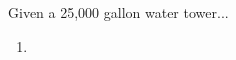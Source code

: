 \documentclass{ximera}
\author{Elizabeth Campolongo}
\begin{document}
\begin{exercise}
Given a 25,000 gallon water tower...
%
\begin{enumerate}

\item 
\end{enumerate}

\end{exercise}
\end{document}
